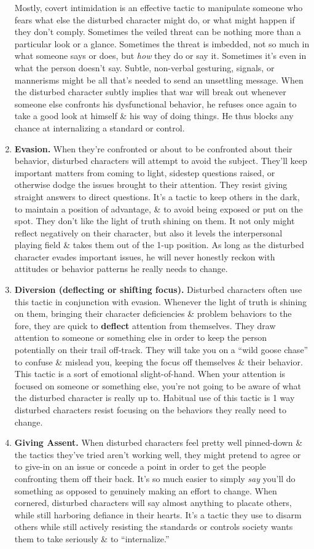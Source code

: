 \documentclass{article}
\numberwithin{equation}{section}
\begin{document}
\begin{enumerate}
	Mostly, covert intimidation is an effective tactic to manipulate someone who fears what else the disturbed character might do, or what might happen if they don't comply. Sometimes the veiled threat can be nothing more than a particular look or a glance. Sometimes the threat is imbedded, not so much in what someone says or does, but \textit{how} they do or say it. Sometimes it's even in what the person doesn't say. Subtle, non-verbal gesturing, signals, or mannerisms might be all that's needed to send an unsettling message. When the disturbed character subtly implies that war will break out whenever someone else confronts his dysfunctional behavior, he refuses once again to take a good look at himself \& his way of doing things. He thus blocks any chance at internalizing a standard or control.
	\item \textbf{Evasion.} When they're confronted or about to be confronted about their behavior, disturbed characters will attempt to avoid the subject. They'll keep important matters from coming to light, sidestep questions raised, or otherwise dodge the issues brought to their attention. They resist giving straight answers to direct questions. It's a tactic to keep others in the dark, to maintain a position of advantage, \& to avoid being exposed or put on the spot. They don't like the light of truth shining on them. It not only might reflect negatively on their character, but also it levels the interpersonal playing field \& takes them out of the 1-up position. As long as the disturbed character evades important issues, he will never honestly reckon with attitudes or behavior patterns he really needs to change.
	\item \textbf{Diversion (deflecting or shifting focus).} Disturbed characters often use this tactic in conjunction with evasion. Whenever the light of truth is shining on them, bringing their character deficiencies \& problem behaviors to the fore, they are quick to \textbf{deflect} attention from themselves. They draw attention to someone or something else in order to keep the person potentially on their trail off-track. They will take you on a ``wild goose chase'' to confuse \& mislead you, keeping the focus off themselves \& their behavior. This tactic is a sort of emotional slight-of-hand. When your attention is focused on someone or something else, you're not going to be aware of what the disturbed character is really up to. Habitual use of this tactic is 1 way disturbed characters resist focusing on the behaviors they really need to change.
	\item \textbf{Giving Assent.} When disturbed characters feel pretty well pinned-down \& the tactics they've tried aren't working well, they might pretend to agree or to give-in on an issue or concede a point in order to get the people confronting them off their back. It's so much easier to simply \textit{say} you'll do something as opposed to genuinely making an effort to change. When cornered, disturbed characters will say almost anything to placate others, while still harboring defiance in their hearts. It's a tactic they use to disarm others while still actively resisting the standards or controls society wants them to take seriously \& to ``internalize.''

\end{enumerate}
\end{document}

